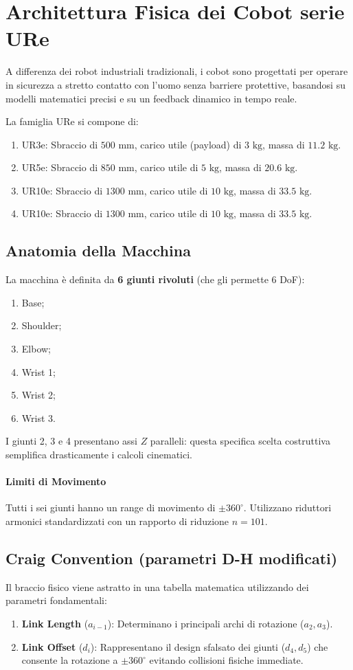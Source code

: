 %
%
\section{Architettura Fisica dei Cobot serie URe}
A differenza dei robot industriali tradizionali, i cobot sono progettati per operare in sicurezza a stretto contatto con l'uomo senza barriere protettive, basandosi su modelli matematici precisi e su un feedback dinamico in tempo reale.

La famiglia URe si compone di:
\begin{enumerate}
    \item UR3e: Sbraccio di $500\text{ mm}$, carico utile (payload) di $3\text{ kg}$, massa di $11.2\text{ kg}$.
    \item UR5e: Sbraccio di $850\text{ mm}$, carico utile di $5\text{ kg}$, massa di $20.6\text{ kg}$.
    \item UR10e: Sbraccio di $1300\text{ mm}$, carico utile di $10\text{ kg}$, massa di $33.5\text{ kg}$.
    \item UR10e: Sbraccio di $1300\text{ mm}$, carico utile di $10\text{ kg}$, massa di $33.5\text{ kg}$.
\end{enumerate}
%
\subsection{Anatomia della Macchina}
La macchina è definita da \textbf{6 giunti rivoluti} (che gli permette 6 DoF):
\begin{enumerate}
    \item Base;
    \item Shoulder;
    \item Elbow;
    \item Wrist 1;
    \item Wrist 2;
    \item Wrist 3.
\end{enumerate}
I giunti 2, 3 e 4 presentano assi $ Z $ paralleli: questa specifica scelta costruttiva semplifica drasticamente i calcoli cinematici.

%
\paragraph{Limiti di Movimento} Tutti i sei giunti hanno un range di movimento di $\pm360^\circ$. Utilizzano riduttori armonici standardizzati con un rapporto di riduzione $n=101$.
%
\subsection{Craig Convention (parametri D-H modificati)}
Il braccio fisico viene astratto in una tabella matematica utilizzando dei parametri fondamentali:
\begin{enumerate}
    \item \textbf{Link Length} ($a_{i-1}$): Determinano i principali archi di rotazione ($a_2, a_3$).
    \item \textbf{Link Offset} ($d_i$): Rappresentano il design sfalsato dei giunti ($d_4, d_5$) che consente la rotazione a $\pm360^\circ$ evitando collisioni fisiche immediate.
\end{enumerate}

